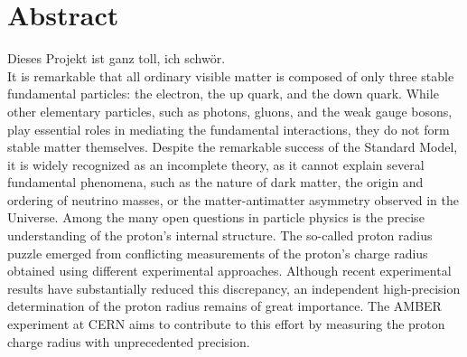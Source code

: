\chapter{Abstract}
Dieses Projekt ist ganz toll, ich schwör.\\

It is remarkable that all ordinary visible matter is composed of only three stable fundamental particles: the electron, the up quark, and the down quark. While other elementary particles, such as photons, gluons, and the weak gauge bosons, play essential roles in mediating the fundamental interactions, they do not form stable matter themselves. Despite the remarkable success of the Standard Model, it is widely recognized as an incomplete theory, as it cannot explain several fundamental phenomena, such as the nature of dark matter, the origin and ordering of neutrino masses, or the matter-antimatter asymmetry observed in the Universe.
Among the many open questions in particle physics is the precise understanding of the proton's internal structure. The so-called proton radius puzzle emerged from conflicting measurements of the proton's charge radius obtained using different experimental approaches. Although recent experimental results have substantially reduced this discrepancy, an independent high-precision determination of the proton radius remains of great importance. The AMBER experiment at CERN aims to contribute to this effort by measuring the proton charge radius with unprecedented precision.